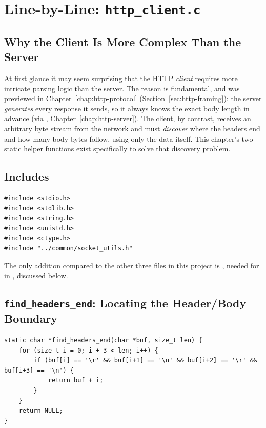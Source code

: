 \chapter{Line-by-Line: \texttt{http\_client.c}}
\label{chap:http-client}

\section{Why the Client Is More Complex Than the Server}

At first glance it may seem surprising that the HTTP \emph{client} requires more intricate parsing logic than the server. The reason is fundamental, and was previewed in Chapter~\ref{chap:http-protocol} (Section~\ref{sec:http-framing}): the server \emph{generates} every response it sends, so it always knows the exact body length in advance (via , Chapter~\ref{chap:http-server}). The client, by contrast, receives an arbitrary byte stream from the network and must \emph{discover} where the headers end and how many body bytes follow, using only the data itself. This chapter's two static helper functions exist specifically to solve that discovery problem.

\section{Includes}

\begin{lstlisting}[style=cstyle]
#include <stdio.h>
#include <stdlib.h>
#include <string.h>
#include <unistd.h>
#include <ctype.h>
#include "../common/socket_utils.h"
\end{lstlisting}

The only addition compared to the other three files in this project is , needed for  in , discussed below.

\section{\texttt{find\_headers\_end}: Locating the Header/Body Boundary}

\begin{lstlisting}[style=cstyle]
static char *find_headers_end(char *buf, size_t len) {
    for (size_t i = 0; i + 3 < len; i++) {
        if (buf[i] == '\r' && buf[i+1] == '\n' && buf[i+2] == '\r' && buf[i+3] == '\n') {
            return buf + i;
        }
    }
    return NULL;
}
\end{lstlisting}

